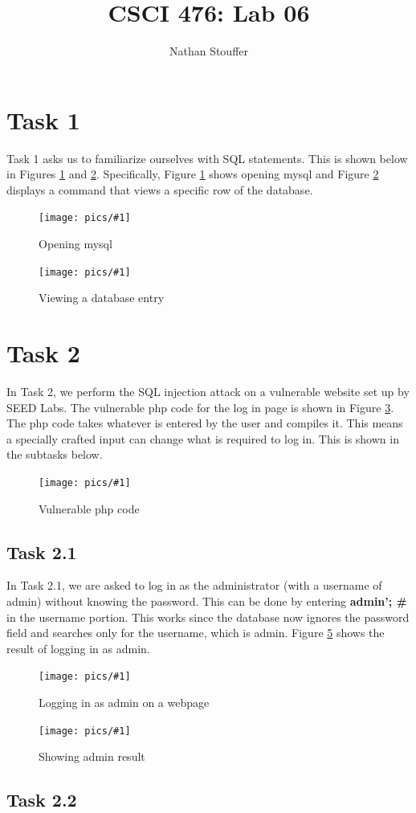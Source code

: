 \documentclass[11pt]{article}
\newcommand{\fig}[2]{ 
\begin{figure}[h]
	\centering
	\caption{#2}
	\texttt{[image: pics/\#1]}
	\label{fig:#1}
\end{figure} 
}
\begin{document}
\title{CSCI 476: Lab 06}
\author{Nathan Stouffer}
\maketitle
\newpage

\section*{Task 1}

Task 1 asks us to familiarize ourselves with SQL statements. This is shown below in Figures \ref{fig:task1.1} and \ref{fig:task1.2}. Specifically, Figure \ref{fig:task1.1} shows opening mysql and Figure \ref{fig:task1.2} displays a command that views a specific row of the database.

\fig{task1.1}{Opening mysql}

\fig{task1.2}{Viewing a database entry}

\newpage 

\section*{Task 2}

In Task 2, we perform the SQL injection attack on a vulnerable website set up by SEED Labs. The vulnerable php code for the log in page is shown in Figure \ref{fig:task2.0}. The php code takes whatever is entered by the user and compiles it. This means a specially crafted input can change what is required to log in. This is shown in the subtasks below.

\fig{task2.0}{Vulnerable php code}

\subsection*{Task 2.1}

In Task 2.1, we are asked to log in as the administrator (with a username of admin) without knowing the password. This can be done by entering {\bf admin'; \#} in the username portion. This works since the database now ignores the password field and searches only for the username, which is admin. Figure \ref{fig:task2.2} shows the result of logging in as admin.

\fig{task2.1}{Logging in as admin on a webpage}

\fig{task2.2}{Showing admin result}

\subsection*{Task 2.2}
\end{document}

